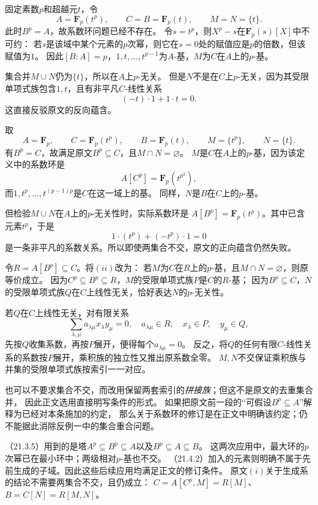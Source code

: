 固定素数$p$和超越元$t$，令
\[
 A=\mathbf F_p(t^p),\qquad C=B=\mathbf F_p(t),\qquad M=N=\{t\}.
\]
此时$B^p=A$，故系数环问题已经不存在。
令$s=t^p$，则$X^p-s$在$\mathbf F_p(s)[X]$中不可约：
若$s$是该域中某个元素的$p$次幂，则它在$s=0$处的赋值应是$p$的倍数，但该赋值为$1$。
因此$[B:A]=p$，$1,t,\ldots,t^{p-1}$为$A$-基，$M$为$C$在$A$上的$p$-基。

集合并$M\cup N$仍为$\{t\}$，所以在$A$上$p$-无关。
但是$N$不是在$C$上$p$-无关，因为其受限单项式族包含$1,t$，且有非平凡$C$-线性关系
\[
 (-t)\cdot1+1\cdot t=0.
\]
这直接反驳原文的反向蕴含。

取
\[
 A=\mathbf F_p,\qquad C=\mathbf F_p(t^p),\qquad B=\mathbf F_p(t),
 \qquad M=\{t^p\},\qquad N=\{t\}.
\]
有$B^p=C$，故满足原文$B^p\subseteq C$，且$M\cap N=\varnothing$。
$M$是$C$在$A$上的$p$-基，因为该定义中的系数环是
\[
 A[C^p]=\mathbf F_p(t^{p^2}),
\]
而$1,t^p,\ldots,t^{(p-1)p}$是$C$在这一域上的基。
同样，$N$是$B$在$C$上的$p$-基。

但检验$M\cup N$在$A$上的$p$-无关性时，实际系数环是
$A[B^p]=\mathbf F_p(t^p)$。其中已含元素$t^p$，于是
\[
 1\cdot(t^p)+(-t^p)\cdot1=0
\]
是一条非平凡的系数关系。所以即使两集合不交，原文的正向蕴含仍然失败。

令$R=A[B^p]\subseteq C$。将$(ii)$改为：
若$M$为$C$在$R$上的$p$-基，且$M\cap N=\varnothing$，则原等价成立。
因为$C^p\subseteq B^p\subseteq R$，$M$的受限单项式族$P$是$C$的$R$-基；
因为$B^p\subseteq C$，$N$的受限单项式族$Q$在$C$上线性无关，恰好表达$N$的$p$-无关性。

若$Q$在$C$上线性无关，对有限关系
\[
 \sum_{\lambda,\mu}a_{\lambda\mu}x_\lambda y_\mu=0,
 \quad a_{\lambda\mu}\in R,\quad x_\lambda\in P,\quad y_\mu\in Q,
\]
先按$Q$收集系数，再按$P$展开，便得每个$a_{\lambda\mu}=0$。
反之，将$Q$的任何有限$C$-线性关系的系数按$P$展开，乘积族的独立性又推出原系数全零。
$M,N$不交保证乘积族与并集的受限单项式族按索引一一对应。

也可以不要求集合不交，而改用保留两套索引的\emph{拼接族}；但这不是原文的去重集合并，
因此正文选用直接明写条件的形式。
如果把原文前一段的“可假设$B^p\subseteq A$”解释为已经对本条施加的约定，
那么关于系数环的修订是在正文中明确该约定；仍不能据此消除反例一中的集合重合问题。

（21.3.5）用到的是塔$A^p\subseteq B^p\subseteq A$以及$B^p\subseteq A\subseteq B$。
这两次应用中，最大环的$p$次幂已在最小环中；两级相对$p$-基也不交。
（21.4.2）加入的元素则明确不属于先前生成的子域。因此这些后续应用均满足正文的修订条件。
原文$(i)$关于生成系的结论不需要两集合不交，且仍成立：
$C=A[C^p,M]=R[M]$、$B=C[N]=R[M,N]$。

